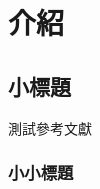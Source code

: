 \chapter{介紹}
\section{小標題}

\zhlipsum[1][name=trad]

測試參考文獻\cite{CpLi} 

\zhlipsum[2][name=trad]

\subsection{小小標題}